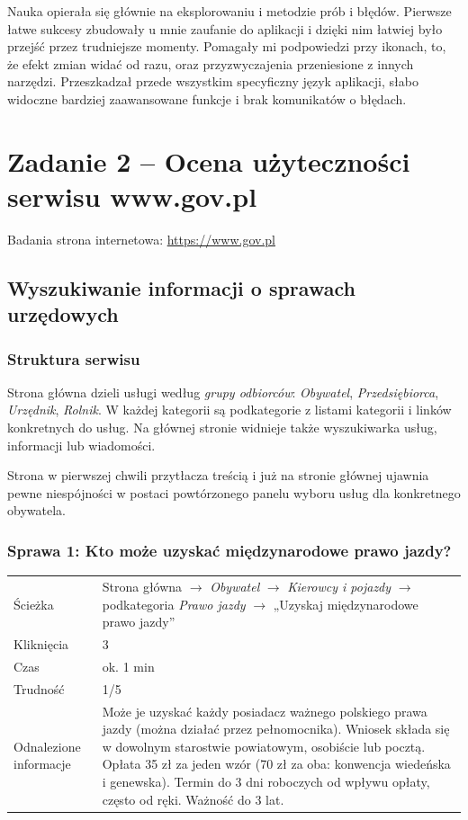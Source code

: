 \documentclass[11pt,a4paper]{article}
\begin{document}
Nauka opierała się głównie na eksplorowaniu i metodzie prób i błędów. Pierwsze łatwe sukcesy zbudowały u mnie zaufanie do aplikacji i dzięki nim łatwiej było przejść przez trudniejsze momenty. Pomagały mi podpowiedzi przy ikonach, to, że efekt zmian widać od razu, oraz przyzwyczajenia przeniesione z innych narzędzi. Przeszkadzał przede wszystkim specyficzny język aplikacji, słabo widoczne bardziej zaawansowane funkcje i brak komunikatów o błędach.

\newpage
\section{Zadanie 2 -- Ocena użyteczności serwisu www.gov.pl}

Badania strona internetowa: \url{https://www.gov.pl}

\subsection{Wyszukiwanie informacji o sprawach urzędowych}

\subsubsection*{Struktura serwisu}

Strona główna dzieli usługi według \textit{grupy odbiorców}: \textit{Obywatel}, \textit{Przedsiębiorca}, \textit{Urzędnik}, \textit{Rolnik}. W każdej kategorii są podkategorie z listami kategorii i linków konkretnych do usług. Na głównej stronie widnieje także wyszukiwarka usług, informacji lub wiadomości.

Strona w pierwszej chwili przytłacza treścią i już na stronie głównej ujawnia pewne niespójności w postaci powtórzonego panelu wyboru usług dla konkretnego obywatela.

\subsubsection*{Sprawa 1: Kto może uzyskać międzynarodowe prawo jazdy?}

\begin{tabularx}{\textwidth}{@{}L{3.6cm}Y@{}}
\toprule
Ścieżka & Strona główna $\rightarrow$ \textit{Obywatel} $\rightarrow$ \textit{Kierowcy i pojazdy} $\rightarrow$ podkategoria \textit{Prawo jazdy} $\rightarrow$ „Uzyskaj międzynarodowe prawo jazdy” \\
Kliknięcia & 3 \\
Czas & ok. 1 min \\
Trudność & 1/5 \\
Odnalezione informacje & Może je uzyskać każdy posiadacz ważnego polskiego prawa jazdy (można działać przez pełnomocnika). Wniosek składa się w dowolnym starostwie powiatowym, osobiście lub pocztą. Opłata 35 zł za jeden wzór (70 zł za oba: konwencja wiedeńska i genewska). Termin do 3 dni roboczych od wpływu opłaty, często od ręki. Ważność do 3 lat. \\
\bottomrule
\end{tabularx}
\end{document}
